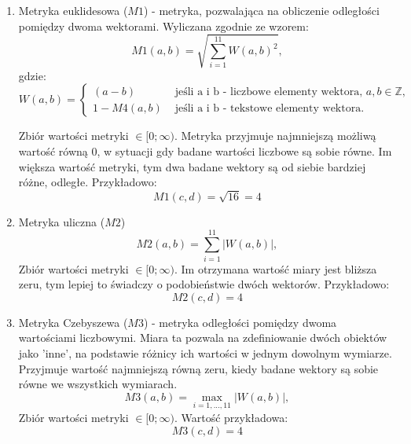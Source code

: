 \documentclass{classrep}
\begin{document}
\begin{enumerate}
  \item Metryka euklidesowa ($M1$) -  metryka, pozwalająca na obliczenie odległości pomiędzy dwoma wektorami. Wyliczana zgodnie ze wzorem:
  \begin{equation}
    M1(a,b) = \sqrt{\sum_{i=1}^{11} W(a, b)^2},
  \end{equation} 
  gdzie:
  \begin{equation}
    W(a, b) = 
    \begin{cases}
      (a - b)   & \text{ jeśli a i b - liczbowe elementy wektora, } a,b \in \mathbb{Z},\\
      1- M4(a, b) & \text{ jeśli a i b - tekstowe elementy wektora.} 
    \end{cases}
  \end{equation}

  Zbiór wartości metryki $\in [0; \infty) $.
  Metryka przyjmuje najmniejszą możliwą wartość równą 0, w sytuacji gdy badane wartości liczbowe są sobie równe.
  Im większa wartość metryki, tym dwa badane wektory są od siebie bardziej różne, odległe. Przykładowo:
  \begin{equation}
    M1(c, d) = \sqrt{16} = 4
  \end{equation}
  \item Metryka uliczna ($M2$)
  \begin{equation}
    M2(a, b) = \sum_{i=1}^{11} |W(a,b)|, 
  \end{equation}
   Zbiór wartości metryki $\in [0; \infty) $.
  Im otrzymana wartość miary jest bliższa zeru, tym lepiej to świadczy o podobieństwie dwóch wektorów. Przykładowo:
  \begin{equation}
    M2(c, d) = 4
  \end{equation}
  \item Metryka Czebyszewa ($M3$) - metryka odległości pomiędzy dwoma wartościami liczbowymi. Miara ta pozwala na zdefiniowanie dwóch obiektów jako 'inne', na podstawie różnicy ich wartości w jednym dowolnym wymiarze.
  Przyjmuje wartość najmniejszą równą zeru, kiedy badane wektory są sobie równe we wszystkich wymiarach.
  \begin{equation}
    M3(a, b) = \max_{i=1, ..., 11} |W(a,b)|, 
  \end{equation}
  Zbiór wartości metryki $\in [0; \infty) $. Wartość przykładowa:
  \begin{equation}
    M3(c, d) = 4
  \end{equation}

\end{enumerate} 
\end{document}
